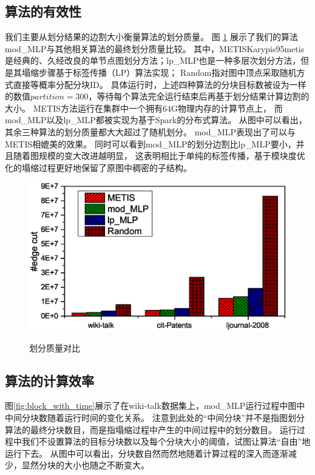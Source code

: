 \documentclass[master]{njuthesis}
\begin{document}
\subsection{算法的有效性}
我们主要从划分结果的边割大小衡量算法的划分质量。
图 \ref{fig:partitionquality} 展示了我们的算法mod\string_MLP与其他相关算法的最终划分质量比较。
其中，METIS\cite{}Karypis95metis是经典的、久经改良的单节点图划分方法；lp\string_MLP\cite{DBLP:conf/icde/WangXSW14}也是一种多层次划分方法，但是其塌缩步骤基于标签传播（LP）算法实现；
Random指对图中顶点采取随机方式直接等概率分配分块ID。
具体运行时，上述四种算法的分块目标数被设为一样的数值$partition=300$，等待每个算法完全运行结束后再基于划分结果计算边割的大小。
METIS方法运行在集群中一个拥有64G物理内存的计算节点上，
而mod\string_MLP以及lp\string_MLP都被实现为基于Spark的分布式算法。
从图中可以看出，其余三种算法的划分质量都大大超过了随机划分。
mod\string_MLP表现出了可以与METIS相媲美的效果。
同时可以看到mod\string_MLP的划分边割比lp\string_MLP要小，并且随着图规模的变大改进越明显，
这表明相比于单纯的标签传播，基于模块度优化的塌缩过程更好地保留了原图中稠密的子结构。
\begin{figure}[h]
  \centering
  \includegraphics[width= 1\textwidth]{figure/edge_cut.eps}\\
  \caption{划分质量对比}
   \label{fig:partitionquality}
\end{figure}
\subsection{算法的计算效率}
图\ref{fig:block_with_time}展示了在wiki-talk数据集上，mod\string_MLP运行过程中图中中间分块数随着运行时间的变化关系。
注意到此处的“中间分块”并不是指图划分算法的最终分块数目，而是指塌缩过程中产生的中间过程中的划分数目。
运行过程中我们不设置算法的目标分块数以及每个分块大小的阈值，试图让算法“自由”地运行下去。
从图中可以看出，分块数自然而然地随着计算过程的深入而逐渐减少，显然分块的大小也随之不断变大。
\end{document}

